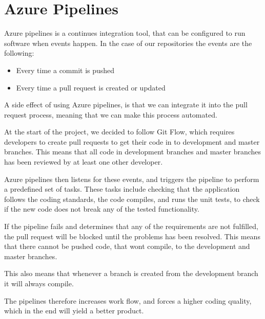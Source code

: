 \section{Azure Pipelines}
\label{azurepipelines}
Azure pipelines is a continues integration tool, that can be configured to run software when events happen.
In the case of our repositories the events are the following:
\begin{itemize}
    \item Every time a commit is pushed
    \item Every time a pull request is created or updated
\end{itemize}

A side effect of using Azure pipelines, is that we can integrate it into the pull request process, meaning that we can make this process automated. 

At the start of the project, we decided to follow Git Flow, which requires developers to create pull requests to get their code in to development and master branches.
This means that all code in development branches and master branches has been reviewed by at least one other developer.

Azure pipelines then listens for these events, and triggers the pipeline to perform a predefined set of tasks.
These tasks include checking that the application follows the coding standards, the code compiles, and runs the unit tests, to check if the new code does not break any of the tested functionality. 

If the pipeline fails and determines that any of the requirements are not fulfilled, the pull request will be blocked until the problems has been resolved.
This means that there cannot be pushed code, that wont compile, to the development and master branches.

This also means that whenever a branch is created from the development branch it will always compile.

The pipelines therefore increases work flow, and forces a higher coding quality, which in the end will yield a better product.






